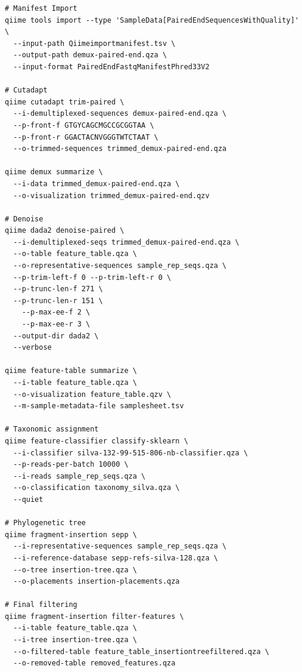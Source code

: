 \documentclass[
]{book}
\begin{document}
\begin{verbatim}
# Manifest Import
qiime tools import --type 'SampleData[PairedEndSequencesWithQuality]' \
  --input-path Qiimeimportmanifest.tsv \
  --output-path demux-paired-end.qza \
  --input-format PairedEndFastqManifestPhred33V2

# Cutadapt
qiime cutadapt trim-paired \
  --i-demultiplexed-sequences demux-paired-end.qza \
  --p-front-f GTGYCAGCMGCCGCGGTAA \
  --p-front-r GGACTACNVGGGTWTCTAAT \
  --o-trimmed-sequences trimmed_demux-paired-end.qza

qiime demux summarize \
  --i-data trimmed_demux-paired-end.qza \
  --o-visualization trimmed_demux-paired-end.qzv

# Denoise
qiime dada2 denoise-paired \
  --i-demultiplexed-seqs trimmed_demux-paired-end.qza \
  --o-table feature_table.qza \
  --o-representative-sequences sample_rep_seqs.qza \
  --p-trim-left-f 0 --p-trim-left-r 0 \
  --p-trunc-len-f 271 \
  --p-trunc-len-r 151 \
    --p-max-ee-f 2 \
    --p-max-ee-r 3 \
  --output-dir dada2 \
  --verbose
  
qiime feature-table summarize \
  --i-table feature_table.qza \
  --o-visualization feature_table.qzv \
  --m-sample-metadata-file samplesheet.tsv
  
# Taxonomic assignment
qiime feature-classifier classify-sklearn \
  --i-classifier silva-132-99-515-806-nb-classifier.qza \
  --p-reads-per-batch 10000 \
  --i-reads sample_rep_seqs.qza \
  --o-classification taxonomy_silva.qza \
  --quiet

# Phylogenetic tree
qiime fragment-insertion sepp \
  --i-representative-sequences sample_rep_seqs.qza \
  --i-reference-database sepp-refs-silva-128.qza \
  --o-tree insertion-tree.qza \
  --o-placements insertion-placements.qza

# Final filtering
qiime fragment-insertion filter-features \
  --i-table feature_table.qza \
  --i-tree insertion-tree.qza \
  --o-filtered-table feature_table_insertiontreefiltered.qza \
  --o-removed-table removed_features.qza
\end{verbatim}
\end{document}
